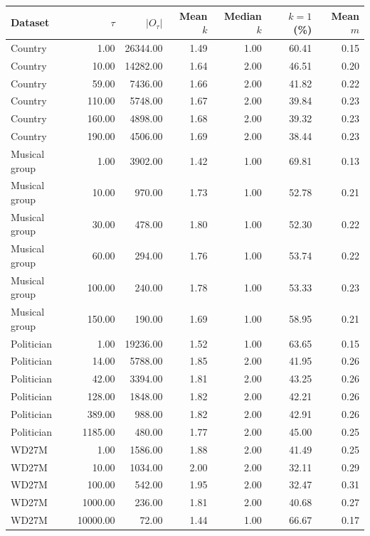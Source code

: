\begin{tabular}{lr rrr rr}
\toprule
Dataset & $\tau$ & $|O_\tau|$ & Mean $k$ & Median $k$ & $k=1$ (\%) & Mean $m$ \\
\midrule
Country & 1.00 & 26344.00 & 1.49 & 1.00 & 60.41 & 0.15 \\
Country & 10.00 & 14282.00 & 1.64 & 2.00 & 46.51 & 0.20 \\
Country & 59.00 & 7436.00 & 1.66 & 2.00 & 41.82 & 0.22 \\
Country & 110.00 & 5748.00 & 1.67 & 2.00 & 39.84 & 0.23 \\
Country & 160.00 & 4898.00 & 1.68 & 2.00 & 39.32 & 0.23 \\
Country & 190.00 & 4506.00 & 1.69 & 2.00 & 38.44 & 0.23 \\
Musical group & 1.00 & 3902.00 & 1.42 & 1.00 & 69.81 & 0.13 \\
Musical group & 10.00 & 970.00 & 1.73 & 1.00 & 52.78 & 0.21 \\
Musical group & 30.00 & 478.00 & 1.80 & 1.00 & 52.30 & 0.22 \\
Musical group & 60.00 & 294.00 & 1.76 & 1.00 & 53.74 & 0.22 \\
Musical group & 100.00 & 240.00 & 1.78 & 1.00 & 53.33 & 0.23 \\
Musical group & 150.00 & 190.00 & 1.69 & 1.00 & 58.95 & 0.21 \\
Politician & 1.00 & 19236.00 & 1.52 & 1.00 & 63.65 & 0.15 \\
Politician & 14.00 & 5788.00 & 1.85 & 2.00 & 41.95 & 0.26 \\
Politician & 42.00 & 3394.00 & 1.81 & 2.00 & 43.25 & 0.26 \\
Politician & 128.00 & 1848.00 & 1.82 & 2.00 & 42.21 & 0.26 \\
Politician & 389.00 & 988.00 & 1.82 & 2.00 & 42.91 & 0.26 \\
Politician & 1185.00 & 480.00 & 1.77 & 2.00 & 45.00 & 0.25 \\
WD27M & 1.00 & 1586.00 & 1.88 & 2.00 & 41.49 & 0.25 \\
WD27M & 10.00 & 1034.00 & 2.00 & 2.00 & 32.11 & 0.29 \\
WD27M & 100.00 & 542.00 & 1.95 & 2.00 & 32.47 & 0.31 \\
WD27M & 1000.00 & 236.00 & 1.81 & 2.00 & 40.68 & 0.27 \\
WD27M & 10000.00 & 72.00 & 1.44 & 1.00 & 66.67 & 0.17 \\
\bottomrule
\end{tabular}
